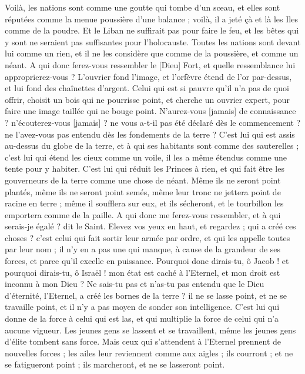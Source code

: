 \begin{multicols}{2}
Voilà, les nations sont comme une goutte qui tombe d'un sceau, et elles sont réputées comme la menue poussière d'une balance ; voilà, il a jeté çà et là les Iles comme de la poudre.
Et le Liban ne suffirait pas pour faire le feu, et les bêtes qui y sont ne seraient pas suffisantes pour l'holocauste.
Toutes les nations sont devant lui comme un rien, et il ne les considère que comme de la poussière, et comme un néant.
A qui donc ferez-vous ressembler le [Dieu] Fort, et quelle ressemblance lui approprierez-vous ?
L'ouvrier fond l'image, et l'orfèvre étend de l'or par-dessus, et lui fond des chaînettes d'argent.
Celui qui est si pauvre qu'il n'a pas de quoi offrir, choisit un bois qui ne pourrisse point, et cherche un ouvrier expert, pour faire une image taillée qui ne bouge point.
N'aurez-vous [jamais] de connaissance ? n'écouterez-vous [jamais] ? ne vous a-t-il pas été déclaré dès le commencement ? ne l'avez-vous pas entendu dès les fondements de la terre ?
C'est lui qui est assis au-dessus du globe de la terre, et à qui ses habitants sont comme des sauterelles ; c'est lui qui étend les cieux comme un voile, il les a même étendus comme une tente pour y habiter.
C'est lui qui réduit les Princes à rien, et qui fait être les gouverneurs de la terre comme une chose de néant.
Même ils ne seront point plantés, même ils ne seront point semés, même leur tronc ne jettera point de racine en terre ; même il soufflera sur eux, et ils sécheront, et le tourbillon les emportera comme de la paille.
A qui donc me ferez-vous ressembler, et à qui serais-je égalé ? dit le Saint.
Elevez vos yeux en haut, et regardez ; qui a créé ces choses ? c'est celui qui fait sortir leur armée par ordre, et qui les appelle toutes par leur nom ; il n'y en a pas une qui manque, à cause de la grandeur de ses forces, et parce qu'il excelle en puissance.
Pourquoi donc dirais-tu, ô Jacob ! et pourquoi dirais-tu, ô Israël ! mon état est caché à l'Eternel, et mon droit est inconnu à mon Dieu ?
Ne sais-tu pas et n'as-tu pas entendu que le Dieu d'éternité, l'Eternel, a créé les bornes de la terre ? il ne se lasse point, et ne se travaille point, et il n'y a pas moyen de sonder son intelligence.
C'est lui qui donne de la force à celui qui est las, et qui multiplie la force de celui qui n'a aucune vigueur.
Les jeunes gens se lassent et se travaillent, même les jeunes gens d'élite tombent sans force.
Mais ceux qui s'attendent à l'Eternel prennent de nouvelles forces ; les ailes leur reviennent comme aux aigles ; ils courront ; et ne se fatigueront point ; ils marcheront, et ne se lasseront point.

\end{multicols}
